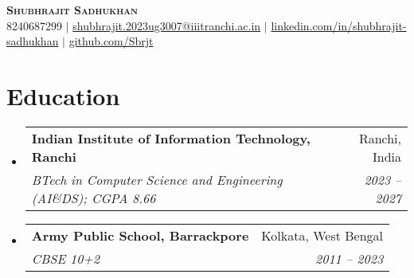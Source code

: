 \documentclass[letterpaper,11pt]{article}
\makeatletter
\newcommand{\resumeSubheading}[4]{
\vspace{-2pt}\item
\begin{tabular*}{0.97\textwidth}[t]{l@{\extracolsep{\fill}}r}
\textbf{#1} & #2 \\
\textit{\small#3} & \textit{\small #4} \\
\end{tabular*}\vspace{-7pt}
}
\newcommand{\resumeSubHeadingListStart}{\begin{itemize}[leftmargin=0.15in, label={}]}
\newcommand{\resumeSubHeadingListEnd}{\end{itemize}}
\makeatother
\begin{document}

\begin{center}
\textbf{\Huge \scshape Shubhrajit Sadhukhan} \\ \vspace{1pt}
\small 8240687299 $|$ \href{mailto:shubhrajit.2023ug3007@iiitranchi.ac.in}{shubhrajit.2023ug3007@iiitranchi.ac.in} $|$
\href{https://linkedin.com/in/shubhrajit-sadhukhan}{linkedin.com/in/shubhrajit-sadhukhan} $|$
\href{https://github.com/Sbrjt}{github.com/Sbrjt}
\end{center}

\section{Education}
\resumeSubHeadingListStart
\resumeSubheading
{Indian Institute of Information Technology, Ranchi}{Ranchi, India}
{BTech in Computer Science and Engineering (AI\&DS); CGPA 8.66}{2023 -- 2027}
\resumeSubheading
{Army Public School, Barrackpore}{Kolkata, West Bengal}
{CBSE 10+2}{2011 -- 2023}
\resumeSubHeadingListEnd

\end{document}
